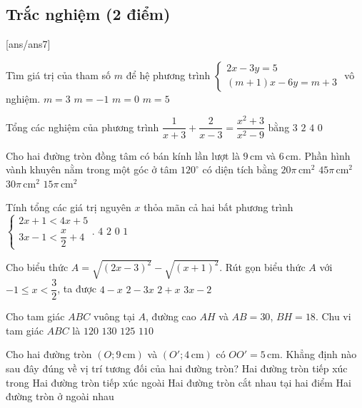 \setcounter{ex}{0} %
\subsection{Trắc nghiệm (2 điểm)}
[ans/ans7]


\begin{ex}
Tìm giá trị của tham số $m$ để hệ phương trình
$\begin{cases}
2x-3y=5\\
(m+1)x-6y=m+3
\end{cases}$
vô nghiệm.
\vspace{0.35cm}
\choice
{\True $m=3$}
{$m=-1$}
{$m=0$}
{$m=5$}
\end{ex}

\begin{ex}
Tổng các nghiệm của phương trình $\dfrac{1}{x+3}+\dfrac{2}{x-3}=\dfrac{x^2+3}{x^2-9}$ bằng
\vspace{0.35cm}
\choice
{$3$}
{$2$}
{$4$}
{\True $0$}
\end{ex}

\begin{ex}
Cho hai đường tròn đồng tâm có bán kính lần lượt là $9\,\text{cm}$ và $6\,\text{cm}$. Phần hình vành khuyên nằm trong một góc ở tâm $120^\circ$ có diện tích bằng
\choice
{$20\pi\,\text{cm}^2$}
{$45\pi\,\text{cm}^2$}
{$30\pi\,\text{cm}^2$}
{\True $15\pi\,\text{cm}^2$}
\end{ex}

\begin{ex}
Tính tổng các giá trị nguyên $x$ thỏa mãn cả hai bất phương trình
$\begin{cases}
2x+1<4x+5\\
3x-1<\dfrac{x}{2}+4
\end{cases}$.
\choice
{$4$}
{$2$}
{\True $0$}
{$1$}
\end{ex}

\begin{ex}
Cho biểu thức
$A=\sqrt{(2x-3)^2}-\sqrt{(x+1)^2}$.
Rút gọn biểu thức $A$ với $-1\le x<\dfrac{3}{2}$, ta được
\choice
{$4-x$}
{\True $2-3x$}
{$2+x$}
{$3x-2$}
\end{ex}

\begin{ex}
Cho tam giác $ABC$ vuông tại $A$, đường cao $AH$ và $AB=30$, $BH=18$. Chu vi tam giác $ABC$ là
\choice
{\True $120$}
{$130$}
{$125$}
{$110$}
\end{ex}

\begin{ex}
Cho hai đường tròn $(O;9\,\text{cm})$ và $(O';4\,\text{cm})$ có $OO'=5\,\text{cm}$. Khẳng định nào sau đây đúng về vị trí tương đối của hai đường tròn?
\choice
{\True Hai đường tròn tiếp xúc trong}
{Hai đường tròn tiếp xúc ngoài}
{Hai đường tròn cắt nhau tại hai điểm}
{Hai đường tròn ở ngoài nhau}
\end{ex}

